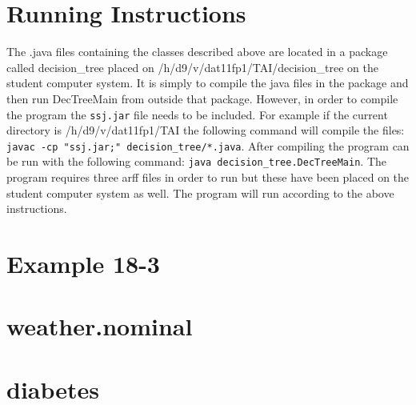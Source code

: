 \documentclass[a4paper]{article}
\begin{document}
\section{Running Instructions} The .java files containing the classes described
above are located in a package called decision\_tree placed on
/h/d9/v/dat11fp1/TAI/decision\_tree on the student computer system. It
is simply to compile the java files in the package and then run DecTreeMain from
outside that package. However, in order to compile the program the \texttt{ssj.jar} file needs to be included. For example if the current directory is
/h/d9/v/dat11fp1/TAI the following command will compile the files: \texttt{javac -cp "ssj.jar;"
decision\_tree/*.java}. After compiling the program can be run with
the following command: \texttt{java decision\_tree.DecTreeMain}. The program requires three arff files in order to run but these have been placed on the student computer system as well. The program will run according to the above instructions.

\appendix
\section{Example 18-3}
\label{18-3}

\section{weather.nominal}
\label{weather}


\section{diabetes}
\label{diabetes}

\end{document}
